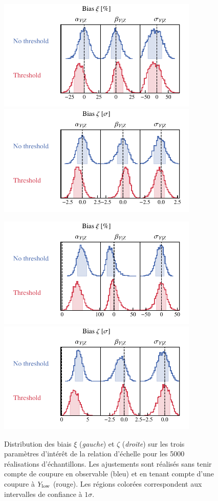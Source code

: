 \begin{figure}[t]
    \centering
    \includegraphics[height=5.3cm]{Figures/Chap_scaling/LPSZ/1_threshold_lowscatt_xi.pdf}
    \includegraphics[height=5.3cm, trim={3cm 0 0 0}, clip]{Figures/Chap_scaling/LPSZ/1_threshold_lowscatt_zeta.pdf}
    \caption{
        Distribution des biais $\xi$ (\textit{gauche}) et $\zeta$ (\textit{droite}) sur les trois paramètres d'intérêt de la relation d'échelle pour les 5000 réalisations d'échantillons.
        Les ajustements sont réalisés sans tenir compte de coupure en observable (bleu) et en tenant compte d'une coupure à $Y_{\rm low}$ (rouge).
        Les régions colorées correspondent aux intervalles de confiance à $1\sigma$.
    }
    \label{fig:scaling:zeta_xi_threshold}
    \vspace{10pt}
    \includegraphics[height=5.3cm]{Figures/Chap_scaling/LPSZ/2_threshold_highscatt_xi.pdf}
    \includegraphics[height=5.3cm, trim={3cm 0 0 0}, clip]{Figures/Chap_scaling/LPSZ/2_threshold_highscatt_zeta.pdf}

\end{figure}
